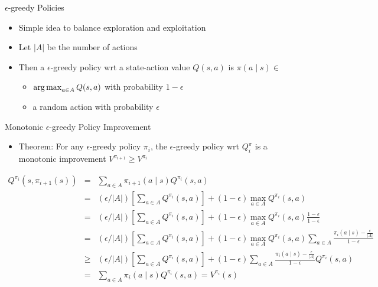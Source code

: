 \begin{frame}[c]{$\epsilon$-greedy Policies}
	
	\begin{itemize}
	\item Simple idea to balance exploration and exploitation
	\item Let $|A|$ be the number of actions
	\item Then a $\epsilon$-greedy policy wrt a state-action value $Q(s,a)$ is $\pi(a\mid s) \in $
	\begin{itemize}
		\item $\operatorname*{arg\,max}_{a\in A} Q(s,a)$ with probability $1 - \epsilon$
		\item a random action with probability $\epsilon$
	\end{itemize}
\end{itemize}
	
\end{frame}
\begin{frame}[c]{Monotonic $\epsilon$-greedy Policy Improvement}
	
	\begin{itemize}
		\item Theorem: For any $\epsilon$-greedy policy $\pi_i$, the $\epsilon$-greedy policy wrt $Q^{\pi}_i$ is a monotonic improvement $V^{\pi_{i+1}} \geq V^{\pi_i}$
	\end{itemize}

\footnotesize
\begin{eqnarray}
Q^{\pi_i} (s,\pi_{i+1} (s)) &=& \sum_{a \in A} \pi_{i+1}(a \mid s) Q^{\pi_{i}}(s,a)\nonumber\\
	&=& (\epsilon / |A|) \left[\sum_{a\in A} Q^{\pi_{i}}(s,a) \right] + (1- \epsilon) \max_{a\in A} Q^{\pi_{i}}(s,a)\nonumber\\
	&=& (\epsilon / |A|) \left[\sum_{a\in A} Q^{\pi_{i}}(s,a) \right] + (1- \epsilon) \max_{a\in A} Q^{\pi_{i}}(s,a)\frac{1-\epsilon}{1-\epsilon}\nonumber\\
	&=& (\epsilon / |A|) \left[\sum_{a\in A} Q^{\pi_{i}}(s,a) \right] + (1- \epsilon) \max_{a\in A} Q^{\pi_{i}}(s,a)\sum_{a\in A}\frac{\pi_i(a\mid s) - \frac{\epsilon}{|A|}}{1-\epsilon}\nonumber\\
	&\geq& (\epsilon / |A|) \left[\sum_{a\in A} Q^{\pi_{i}}(s,a) \right] + (1- \epsilon) \sum_{a\in A}\frac{\pi_i(a\mid s) - \frac{\epsilon}{|A|}}{1-\epsilon} Q^{\pi_{i}}(s,a)\nonumber\\
	&=& \sum_{a\in A} \pi_i (a \mid s) Q^{\pi_i}(s,a) = V^{\pi_i}(s)\nonumber
\end{eqnarray}
	
\end{frame}
